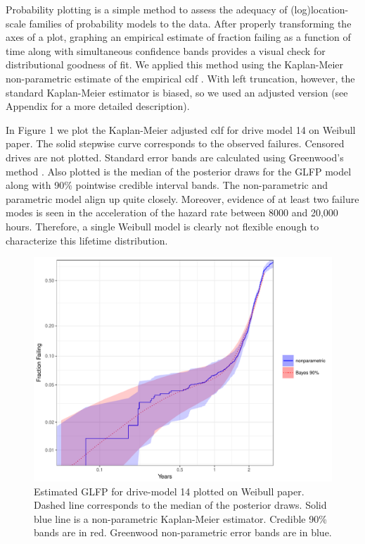 \documentclass[12pt]{article}
\begin{document}
Probability plotting is a simple method to assess the adequacy of (log)location-scale families of probability models to the data.  After properly transforming the axes of a plot, graphing an empirical estimate of fraction failing as a function of time along with simultaneous confidence bands provides a visual check for distributional goodness of fit.  We applied this method using the Kaplan-Meier non-parametric estimate of the empirical cdf \cite{kaplan}.  With left truncation, however, the standard Kaplan-Meier estimator is biased, so we used an adjusted version (see Appendix for a more detailed description).   

In Figure 1 we plot the Kaplan-Meier adjusted cdf for drive model 14 on Weibull paper.  The solid stepwise curve corresponds to the observed failures.  Censored drives are not plotted.  Standard error bands are calculated using Greenwood's method \cite{green}.  Also plotted is the median of the posterior draws for the GLFP model along with 90\% pointwise credible interval bands.  The non-parametric and parametric model align up quite closely.  Moreover, evidence of at least two failure modes is seen in the acceleration of the hazard rate between 8000 and 20,000 hours.  Therefore, a single Weibull model is clearly not flexible enough to characterize this lifetime distribution.

\begin{figure}[H]
\centering
  \includegraphics[width=.8\textwidth]{fig/drive14cred.pdf}
  \caption{Estimated GLFP for drive-model 14 plotted on Weibull paper.  Dashed line corresponds to the median of the posterior draws.  Solid blue line is a non-parametric Kaplan-Meier estimator.  Credible 90\% bands are in red.  Greenwood non-parametric error bands are in blue.}
  \label{fig1}
\end{figure}
\end{document}
